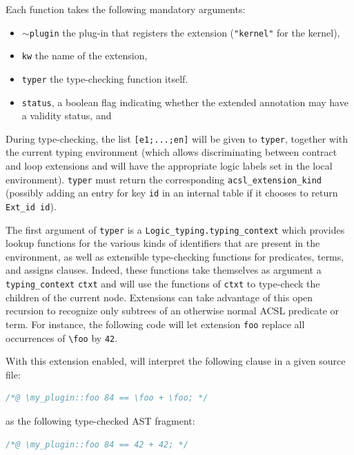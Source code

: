 Each function takes the following mandatory arguments:
\begin{itemize}
\item \texttt{$\sim$plugin} the plug-in that registers the extension
      (\texttt{"kernel"} for the kernel),
\item \texttt{kw} the name of the extension,
\item \texttt{typer} the type-checking function itself.
\item \texttt{status}, a boolean flag indicating whether the extended
  annotation may have a validity status, and

\end{itemize}

During type-checking, the list \verb|[e1;...;en]| will be given to \verb|typer|,
together with the current typing environment (which allows discriminating
between contract and loop extensions and will have the appropriate logic labels
set in the local environment). \verb|typer| must return the corresponding
\verb|acsl_extension_kind| (possibly adding an entry for key \verb|id|
in an internal table if it chooses to return \verb|Ext_id id|).

The first argument of \verb|typer| is a \verb|Logic_typing.typing_context|%
 which provides lookup functions for the
various kinds of identifiers that are present in the environment, as well as
extensible type-checking functions for predicates, terms, and assigns clauses.
Indeed, these functions take themselves as argument a \verb|typing_context|
\verb|ctxt| and will use the functions of \verb|ctxt| to type-check the children
of the current node. Extensions can take advantage of this open recursion to
recognize only subtrees of an otherwise normal ACSL predicate or term. For
instance, the following code will let extension \verb|foo| replace all
occurrences of \verb|\foo| by \verb|42|.


With this extension enabled, \framac will interpret the following clause in
a given source file:
\begin{lstlisting}[language=C,alsolanguage=ACSL]
/*@ \my_plugin::foo 84 == \foo + \foo; */
\end{lstlisting}
as the following type-checked AST fragment:
\begin{lstlisting}[language=C,alsolanguage=ACSL]
/*@ \my_plugin::foo 84 == 42 + 42; */
\end{lstlisting}

